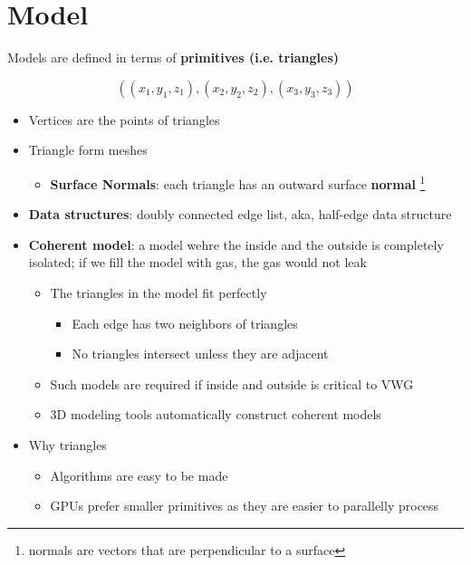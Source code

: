 \chapter{Model}\label{chapter: model}

Models are defined in terms of \textbf{primitives (i.e. triangles)}

\begin{equation}
  \left(
    \left( x_{1}, y_{1}, z_{1} \right),
    \left( x_{2}, y_{2}, z_{2} \right),
    \left( x_{3}, y_{3}, z_{3} \right)
  \right)
\end{equation}

\begin{itemize}
  \item Vertices are the points of triangles
  \item Triangle form meshes
  \begin{itemize}
    \item \textbf{Surface Normals}: each triangle has an outward surface
    \textbf{normal} \footnote{normals are vectors that are perpendicular to a
    surface}
  \end{itemize}
  \item \textbf{Data structures}: doubly connected edge list, aka, half-edge
  data structure

  \item \textbf{Coherent model}: a model wehre the inside and the outside is
  completely isolated; if we fill the model with gas, the gas would not leak
  \begin{itemize}
    \item The triangles in the model fit perfectly
    \begin{itemize}
      \item Each edge has two neighbors of triangles
      \item No triangles intersect unless they are adjacent
    \end{itemize}

    \item Such models are required if inside and outside is critical to VWG
    \item 3D modeling tools automatically construct coherent models
  \end{itemize}

  \item Why triangles
  \begin{itemize}
    \item Algorithms are easy to be made
    \item GPUs prefer smaller primitives as they are easier to parallelly
    process
  \end{itemize}


\end{itemize}
